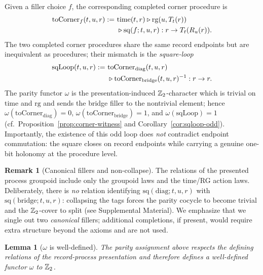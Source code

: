 \documentclass[aps,prl,reprint,floatfix]{revtex4-2}
\theoremstyle{plain}
\newtheorem{lemma}{Lemma}
\theoremstyle{definition}
\newtheorem{remark}{Remark}
\begin{document}
Given a filler choice $f$, the corresponding completed corner procedure is
\begin{equation}
\begin{aligned}
\mathrm{toCorner}_f(t,u,r)
:=\ &\mathrm{time}(t,r)\mathbin{\triangleright} \mathrm{rg}(u,T_t(r)) \\
&\mathbin{\triangleright} \mathrm{sq}(f;t,u,r) : r \to T_t(R_u(r)).
\end{aligned}
\label{eq:toCorner}
\end{equation}
The two completed corner procedures share the same record endpoints but are inequivalent as procedures; their mismatch is the \emph{square-loop}
\begin{equation}
\begin{aligned}
\mathrm{sqLoop}(t,u,r)
:=\ &\mathrm{toCorner}_{\mathrm{diag}}(t,u,r) \\
&\mathbin{\triangleright} \mathrm{toCorner}_{\mathrm{bridge}}(t,u,r)^{-1} : r \to r.
\end{aligned}
\label{eq:sqLoop}
\end{equation}
The parity functor $\omega$ is the presentation-induced $\mathbb{Z}_2$-character which is trivial on $\mathrm{time}$ and $\mathrm{rg}$ and sends the bridge filler to the nontrivial element; hence $\omega(\mathrm{toCorner}_{\mathrm{diag}})=0$, $\omega(\mathrm{toCorner}_{\mathrm{bridge}})=1$, and $\omega(\mathrm{sqLoop})=1$ (cf.\ Proposition~\ref{prop:corner-witness} and Corollary~\ref{cor:sqloop-odd}).
Importantly, the existence of this odd loop does \emph{not} contradict endpoint commutation: the square closes on record endpoints while carrying a genuine one-bit holonomy at the procedure level.

\begin{remark}[Canonical fillers and non-collapse]
The relations of the presented process groupoid include only the groupoid laws and the time/RG action laws.
Deliberately, there is \emph{no} relation identifying $\mathrm{sq}(\mathrm{diag};t,u,r)$ with
$\mathrm{sq}(\mathrm{bridge};t,u,r)$: collapsing the tags forces the parity cocycle to become trivial and the
$\mathbb{Z}_2$-cover to split (see Supplemental Material). We emphasize that we single out two \emph{canonical} fillers;
additional completions, if present, would require extra structure beyond the axioms and are not used.
\end{remark}

\begin{lemma}[$\omega$ is well-defined]
\label{lem:omega-well-defined}
The parity assignment above respects the defining relations of the record-process presentation and therefore defines
a well-defined functor $\omega$ to $\mathbb{Z}_2$.
\end{lemma}
\end{document}
